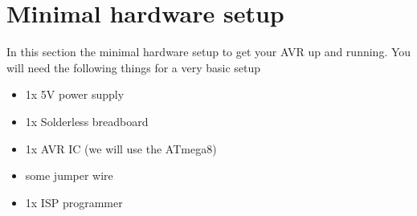 \section{Minimal hardware setup}

In this section the minimal hardware setup to get your AVR up and running. You will need the following things for a very basic setup

\begin{itemize}
  \item {1x 5V power supply}
  \item {1x Solderless breadboard}
  \item {1x AVR IC (we will use the ATmega8)}
  \item {some jumper wire}
  \item {1x ISP programmer}
\end{itemize}

